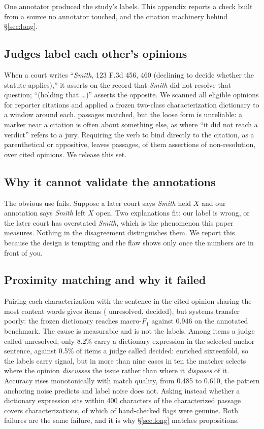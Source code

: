 One annotator produced the study's labels. This appendix reports a check built
from a source no annotator touched, and the citation machinery behind
\S\ref{sec:long}.

\subsection{Judges label each other's opinions}
When a court writes ``\emph{Smith}, 123 F.3d 456, 460 (declining to decide
whether the statute applies),'' it asserts on the record that \emph{Smith} did
not resolve that question; ``(holding that \dots)'' asserts the opposite. We
scanned all \NEligible{} eligible opinions for reporter citations and applied a
frozen two-class characterization dictionary to a window around each.
\NCharLoose{} passages matched, but the loose form is unreliable: a marker near a
citation is often about something else, as where ``it did not reach a verdict''
refers to a jury. Requiring the verb to bind directly to the citation, as a
parenthetical or appositive, leaves \NCharTight{} passages, \NCharLZero{} of them
assertions of non-resolution, over \NCharOps{} cited opinions. We release this
set.

\subsection{Why it cannot validate the annotations}
The obvious use fails. Suppose a later court says \emph{Smith} held $X$ and our
annotation says \emph{Smith} left $X$ open. Two explanations fit: our label is
wrong, or the later court has overstated \emph{Smith}, which is the phenomenon
this paper measures. Nothing in the disagreement distinguishes them. We report
this because the design is tempting and the flaw shows only once the numbers are
in front of you.

\subsection{Proximity matching and why it failed}
Pairing each characterization with the sentence in the cited opinion sharing the
most content words gives \NJudgeBench{} items (\NJudgeUnres{} unresolved,
\NJudgeDec{} decided), but systems transfer poorly: the frozen dictionary reaches
\JudgeLexF{} macro-$F_1$ against 0.946 on the annotated benchmark. The cause is
measurable and is not the labels. Among items a judge called unresolved, only
8.2\% carry a dictionary expression in the selected anchor sentence, against
0.5\% of items a judge called decided: enriched sixteenfold, so the labels carry
signal, but in more than nine cases in ten the matcher selects where the opinion
\emph{discusses} the issue rather than where it \emph{disposes} of it. Accuracy
rises monotonically with match quality, from 0.485 to 0.610, the pattern
anchoring noise predicts and label noise does not. Asking instead whether a
dictionary expression sits within 400 characters of the characterized passage
covers \NEscN{} characterizations, of which \NProxyGood{} of \NProxyCheck{}
hand-checked flags were genuine. Both failures are the same failure, and it is
why \S\ref{sec:long} matches propositions.

